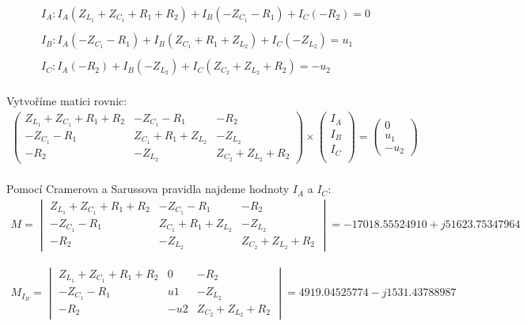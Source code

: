 \begin{gather*}
    I_A: I_A(Z_{L_1} + Z_{C_1} + R_1 + R_2) + I_B(-Z_{C_1} - R_1) + I_C(-R_2) = 0 \\\\
    I_B: I_A(-Z_{C_1} - R_1) + I_B(Z_{C_1} + R_1 + Z_{L_2}) + I_C(-Z_{L_2}) = u_1 \\\\
    I_C: I_A(-R_2) + I_B(-Z_{L_2}) + I_C(Z_{C_2} + Z_{L_2} + R_2) = -u_2 \\
\end{gather*}

\noindent Vytvoříme matici rovnic:
\begin{gather*}
    \begin{pmatrix}
    Z_{L_1} + Z_{C_1} + R_1 + R_2 & -Z_{C_1} - R_1 & -R_2 \\
    -Z_{C_1} - R_1 & Z_{C_1} + R_1 + Z_{L_2} & -Z_{L_2} \\
    -R_2 & -Z_{L_2} & Z_{C_2} + Z_{L_2} + R_2
    \end{pmatrix}
    \times
    \begin{pmatrix}
    I_A \\
    I_B \\
    I_C \\
    \end{pmatrix}
    =
    \begin{pmatrix}
    0 \\
    u_1 \\
    -u_2
    \end{pmatrix}
\end{gather*}
\\

Pomocí Cramerova a Sarussova pravidla najdeme hodnoty $I_A$ a $I_C$:
\begin{gather*}
    M = 
    \begin{vmatrix}
    Z_{L_1} + Z_{C_1} + R_1 + R_2 & -Z_{C_1} - R_1 & -R_2 \\
    -Z_{C_1} - R_1 & Z_{C_1} + R_1 + Z_{L_2} & -Z_{L_2} \\
    -R_2 & -Z_{L_2} & Z_{C_2} + Z_{L_2} + R_2
    \end{vmatrix}
    =
    -17018.55524910 + j51623.75347964
\end{gather*}

\begin{gather*}
    M_{I_B} = 
    \begin{vmatrix}
    Z_{L_1} + Z_{C_1} + R_1 + R_2 & 0 & -R_2 \\
    -Z_{C_1} - R_1 & u1 & -Z_{L_2} \\
    -R_2 & -u2 & Z_{C_2} + Z_{L_2} + R_2
    \end{vmatrix}
    =
    4919.04525774 - j1531.43788987
\end{gather*}


